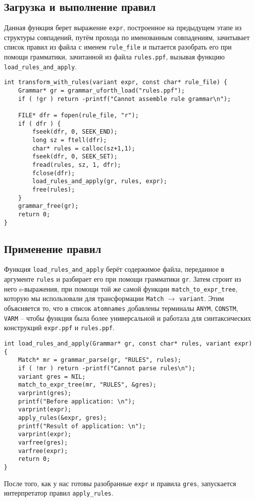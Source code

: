 \documentclass[10pt]{report}
\begin{document}
\subsection{Загрузка и выполнение правил}
Данная функция берет выражение \verb|expr|, построенное на предыдущем этапе из структуры совпадений, путём прохода по именованным совпадениям, зачитывает список правил из файла с именем \verb|rule_file| и пытается разобрать его при помощи грамматики, зачитанной из файла \verb|rules.ppf|, вызывая функцию \verb|load_rules_and_apply|.
\begin{lstlisting}[firstnumber=69, caption=diff.c Загрузка\, парсинг и применение правил]
int transform_with_rules(variant expr, const char* rule_file) {
	Grammar* gr = grammar_uforth_load("rules.ppf");
	if ( !gr ) return -printf("Cannot assemble rule grammar\n");

	FILE* dfr = fopen(rule_file, "r");
	if ( dfr ) {
		fseek(dfr, 0, SEEK_END);
		long sz = ftell(dfr);
		char* rules = calloc(sz+1,1);
		fseek(dfr, 0, SEEK_SET);
		fread(rules, sz, 1, dfr);
		fclose(dfr);
		load_rules_and_apply(gr, rules, expr);
		free(rules);
	}
	grammar_free(gr);
	return 0;
}
\end{lstlisting}
\subsection{Применение правил}
Функция \verb|load_rules_and_apply| берёт содержимое файла, переданное в аргументе \verb|rules| и разбирает его при помощи грамматики \verb|gr|. Затем строит из него s-выражения, при помощи той же самой функции \verb|match_to_expr_tree|, которую мы использовали для трансформации \verb|Match| $\to$ \verb|variant|. Этим объясняется то, что в список \verb|atomnames| добавлены терминалы \verb|ANYM|, \verb|CONSTM|, \verb|VARM| -- чтобы функция была более универсальной и работала для синтаксических конструкций \verb|expr.ppf| и \verb|rules.ppf|.
\begin{lstlisting}[firstnumber=56, caption=diff.c Разбор правил и запуск на выражении]
int load_rules_and_apply(Grammar* gr, const char* rules, variant expr) {
	Match* mr = grammar_parse(gr, "RULES", rules);
	if ( !mr ) return -printf("Cannot parse rules\n");
	variant gres = NIL;
	match_to_expr_tree(mr, "RULES", &gres);
	varprint(gres);
	printf("Before application: \n");
	varprint(expr);
	apply_rules(&expr, gres);
	printf("Result of application: \n");
	varprint(expr);
	varfree(gres);
	varfree(expr);
	return 0;
}
\end{lstlisting}
После того, как у нас готовы разобранные \verb|expr| и правила \verb|gres|, запускается интерпретатор правил \verb|apply_rules|.
\end{document}
